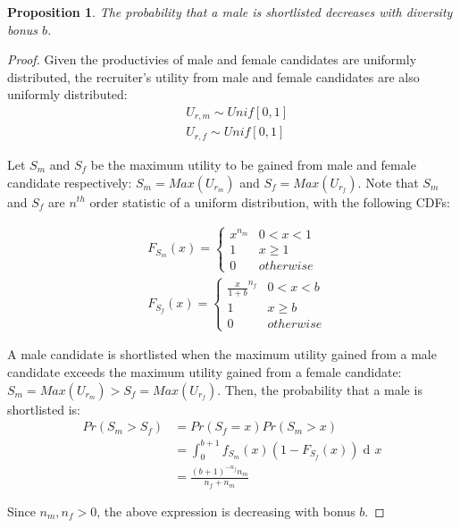 \documentclass[11pt]{article}
\DeclareMathOperator{\di}{d\!}
\newcommand{\Unif}{\textit{Unif}[0,1]}
\newtheorem{proposition}{Proposition}
\begin{document}
\begin{proposition}
    The probability that a male is shortlisted decreases with diversity bonus $b$.
\end{proposition}

\begin{proof}
    Given the productivies of male and female candidates are uniformly distributed, the recruiter's utility from male and female candidates are also uniformly distributed:
    \begin{align*}
         & U_{r,m} \sim \Unif \\
         & U_{r,f} \sim \Unif
    \end{align*}

    Let $S_m$ and $S_f$ be the maximum utility to be gained from male and female candidate respectively:
    $S_m=Max(U_{r_m})$ and $S_f=Max(U_{r_f})$. Note that $S_m$ and $S_f$ are $n^{th}$ order statistic of a uniform distribution, with the following CDFs:

    \begin{align*}
         & F_{S_m}(x) =
        \begin{cases}
            x^{n_m} & 0 < x < 1 \\
            1       & x \geq 1  \\
            0       & otherwise
        \end{cases}
        \\
         & F_{S_f}(x) =
        \begin{cases}
            \frac{x}{1+b}^{n_f} & 0 < x < b \\
            1                   & x \geq b  \\
            0                   & otherwise
        \end{cases}
    \end{align*}


    A male candidate is shortlisted when the maximum utility gained from a male candidate exceeds the maximum utility gained from a female candidate: $S_m=Max(U_{r_m}) > S_f=Max(U_{r_f})$. Then, the probability that a male is shortlisted is:
    \begin{align*}
        Pr(S_m > S_f) & = Pr(S_f = x) Pr(S_m > x)                        \\
                      & = \int_{0}^{b+1} f_{S_m}(x) (1-F_{S_f}(x)) \di x \\
                      & = \frac{(b+1)^{-n_f} n_m}{n_f+n_m}
    \end{align*}

    Since $n_m, n_f >0$, the above expression is decreasing with bonus $b$.

\end{proof}
\end{document}
